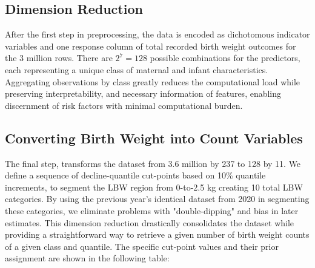 \subsection{Dimension Reduction}
\label{sec:ch2-dimension-reduction}

After the first step in preprocessing, the data is encoded as dichotomous indicator variables and one response column of total recorded birth weight outcomes for the 3 million rows. There are \(2^7 = 128\) possible combinations for the predictors, each representing a unique class of maternal and infant characteristics. Aggregating observations by class greatly reduces the computational load while preserving interpretability, and necessary information of features, enabling discernment of risk factors with minimal computational burden.

\subsection{Converting Birth Weight into Count Variables} 
\label{sec:ch2-count-variables}

The final step, transforms the dataset from 3.6 million by 237 to 128 by 11. We define a sequence of decline-quantile cut-points based on 10\% quantile increments, to segment the LBW region from 0-to-2.5 kg creating 10 total LBW categories. By using the previous year's identical dataset from 2020 in segmenting these categories, we eliminate problems with "double-dipping" and bias in later estimates. This dimension reduction drastically consolidates the dataset while providing a straightforward way to retrieve a given number of birth weight counts of a given class and quantile. The specific cut-point values and their prior assignment are shown in the following table:

